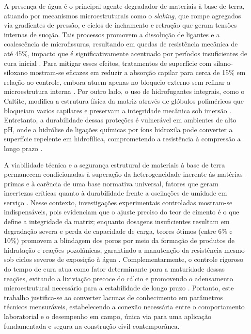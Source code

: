 
A presença de água é o principal agente degradador de materiais à base de terra, atuando por mecanismos microestruturais como o \textit{slaking}, que rompe agregados via gradientes de pressão, e ciclos de inchamento e retração que geram tensões internas de sucção. Tais processos promovem a dissolução de ligantes e a coalescência de microfissuras, resultando em quedas de resistência mecânica de até 45\%, impacto que é significativamente acentuado por períodos insuficientes de cura inicial \cite{Hu2018, Liu2023, Ralf2025}. Para mitigar esses efeitos, tratamentos de superfície com silano-siloxano mostram-se eficazes em reduzir a absorção capilar para cerca de 15\% em relação ao controle, embora atuem apenas no bloqueio externo sem refinar a microestrutura interna \cite{Bogas2020}. Por outro lado, o uso de hidrofugantes integrais, como o Caltite, modifica a estrutura física da matriz através de glóbulos poliméricos que bloqueiam vazios capilares e preservam a integridade mecânica sob imersão \cite{Ezreig2022}. Entretanto, a durabilidade dessas proteções é vulnerável em ambientes de alto pH, onde a hidrólise de ligações químicas por íons hidroxila pode converter a superfície repelente em hidrofílica, comprometendo a resistência à compressão a longo prazo \cite{Guo2025}.


A viabilidade técnica e a segurança estrutural de materiais à base de terra permanecem condicionadas à superação da heterogeneidade inerente às matérias-primas e à carência de uma base normativa universal, fatores que geram incertezas críticas quanto à durabilidade frente a oscilações de umidade em serviço \cite{Giada2019, Pham2022, Santana2021, Martins2018, Bogas2019, VanDerLinden2019}. Nesse contexto, investigações experimentais controladas mostram-se indispensáveis, pois evidenciam que o ajuste preciso do teor de cimento é o que define a integridade da matriz; enquanto dosagens insuficientes resultam em degradação severa e perda de capacidade de carga, teores ótimos (entre 6\% e 10\%) promovem a blindagem dos poros por meio da formação de produtos de hidratação e reações pozolânicas, garantindo a manutenção da resistência mesmo sob ciclos severos de exposição à água \cite{Morel2021, Martins2018, Roshan2022, Ralf2025, Wahabi2021}. Complementarmente, o controle rigoroso do tempo de cura atua como fator determinante para a maturidade dessas reações, evitando a lixiviação precoce do cálcio e promovendo o adensamento microestrutural necessário para a estabilidade de longo prazo \cite{Ezreig2022,Morel2021}. Portanto, este trabalho justifica-se ao converter lacunas de conhecimento em parâmetros técnicos mensuráveis, estabelecendo a conexão necessária entre o comportamento laboratorial e o desempenho em campo, única via para uma aplicação fundamentada e segura na construção civil contemporânea.

